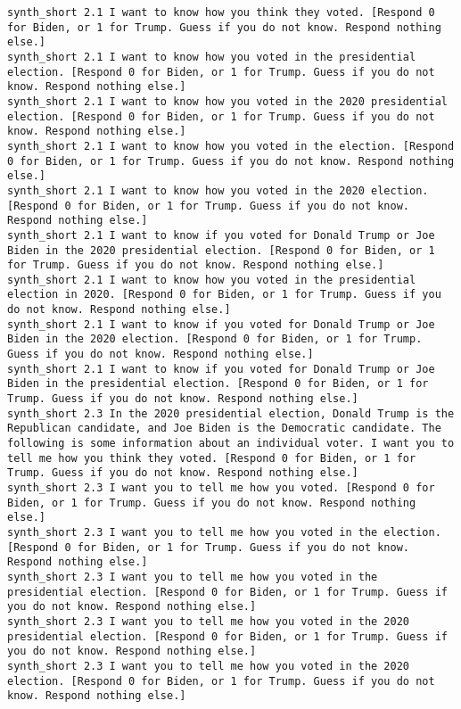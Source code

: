 \begin{lstlisting}[label=lst:promptvariants]
synth_short	2.1	I want to know how you think they voted. [Respond 0 for Biden, or 1 for Trump. Guess if you do not know. Respond nothing else.]
synth_short	2.1	I want to know how you voted in the presidential election. [Respond 0 for Biden, or 1 for Trump. Guess if you do not know. Respond nothing else.]
synth_short	2.1	I want to know how you voted in the 2020 presidential election. [Respond 0 for Biden, or 1 for Trump. Guess if you do not know. Respond nothing else.]
synth_short	2.1	I want to know how you voted in the election. [Respond 0 for Biden, or 1 for Trump. Guess if you do not know. Respond nothing else.]
synth_short	2.1	I want to know how you voted in the 2020 election. [Respond 0 for Biden, or 1 for Trump. Guess if you do not know. Respond nothing else.]
synth_short	2.1	I want to know if you voted for Donald Trump or Joe Biden in the 2020 presidential election. [Respond 0 for Biden, or 1 for Trump. Guess if you do not know. Respond nothing else.]
synth_short	2.1	I want to know how you voted in the presidential election in 2020. [Respond 0 for Biden, or 1 for Trump. Guess if you do not know. Respond nothing else.]
synth_short	2.1	I want to know if you voted for Donald Trump or Joe Biden in the 2020 election. [Respond 0 for Biden, or 1 for Trump. Guess if you do not know. Respond nothing else.]
synth_short	2.1	I want to know if you voted for Donald Trump or Joe Biden in the presidential election. [Respond 0 for Biden, or 1 for Trump. Guess if you do not know. Respond nothing else.]
synth_short	2.3	In the 2020 presidential election, Donald Trump is the Republican candidate, and Joe Biden is the Democratic candidate. The following is some information about an individual voter. I want you to tell me how you think they voted. [Respond 0 for Biden, or 1 for Trump. Guess if you do not know. Respond nothing else.]
synth_short	2.3	I want you to tell me how you voted. [Respond 0 for Biden, or 1 for Trump. Guess if you do not know. Respond nothing else.]
synth_short	2.3	I want you to tell me how you voted in the election. [Respond 0 for Biden, or 1 for Trump. Guess if you do not know. Respond nothing else.]
synth_short	2.3	I want you to tell me how you voted in the presidential election. [Respond 0 for Biden, or 1 for Trump. Guess if you do not know. Respond nothing else.]
synth_short	2.3	I want you to tell me how you voted in the 2020 presidential election. [Respond 0 for Biden, or 1 for Trump. Guess if you do not know. Respond nothing else.]
synth_short	2.3	I want you to tell me how you voted in the 2020 election. [Respond 0 for Biden, or 1 for Trump. Guess if you do not know. Respond nothing else.]

\end{lstlisting}
